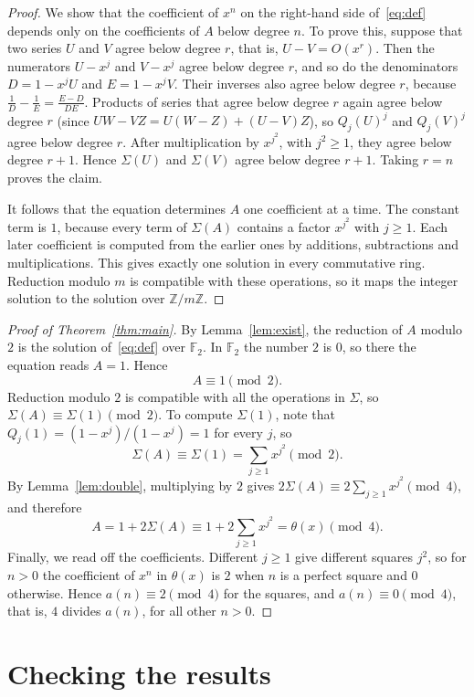 \documentclass[11pt,a4paper]{article}
\theoremstyle{definition}
\theoremstyle{remark}
\newcommand{\Z}{\mathbb{Z}}
\newcommand{\F}{\mathbb{F}}
\begin{document}
\begin{proof}
We show that the coefficient of $x^n$ on the right-hand side of~\eqref{eq:def} depends only on the coefficients of $A$
below degree $n$. To prove this, suppose that two series $U$ and $V$ agree below degree $r$, that is, $U-V=O(x^r)$. Then the numerators $U-x^j$ and
$V-x^j$ agree below degree $r$, and so do the denominators $D=1-x^jU$ and $E=1-x^jV$. Their inverses also agree below
degree $r$, because $\frac1D-\frac1E=\frac{E-D}{DE}$. Products of series that agree below degree $r$ again agree below
degree $r$ (since $UW-VZ=U(W-Z)+(U-V)Z$), so $Q_j(U)^j$ and $Q_j(V)^j$ agree below degree $r$. After multiplication by
$x^{j^2}$, with $j^2\ge1$, they agree below degree $r+1$. Hence $\Sigma(U)$ and $\Sigma(V)$ agree below degree $r+1$.
Taking $r=n$ proves the claim.

It follows that the equation determines $A$ one coefficient at a time. The constant term is $1$, because every term of
$\Sigma(A)$ contains a factor $x^{j^2}$ with $j\ge1$. Each later coefficient is computed from the earlier ones by
additions, subtractions and multiplications. This gives exactly one solution in every commutative ring. Reduction
modulo $m$ is compatible with these operations, so it maps the integer solution to the solution over $\Z/m\Z$.
\end{proof}

\begin{proof}[Proof of Theorem~\ref{thm:main}]
By Lemma~\ref{lem:exist}, the reduction of $A$ modulo $2$ is the solution of~\eqref{eq:def} over $\F_2$. In $\F_2$ the
number $2$ is $0$, so there the equation reads $A=1$. Hence
\[
A\equiv1\pmod 2 .
\]
Reduction modulo $2$ is compatible with all the operations in $\Sigma$, so $\Sigma(A)\equiv\Sigma(1)\pmod2$. To compute
$\Sigma(1)$, note that $Q_j(1)=(1-x^j)/(1-x^j)=1$ for every $j$, so
\[
\Sigma(A)\equiv\Sigma(1)=\sum_{j\ge1}x^{j^2}\pmod 2 .
\]
By Lemma~\ref{lem:double}, multiplying by $2$ gives $2\Sigma(A)\equiv2\sum_{j\ge1}x^{j^2}\pmod4$, and therefore
\[
A=1+2\Sigma(A)\equiv1+2\sum_{j\ge1}x^{j^2}=\theta(x)\pmod 4 .
\]
Finally, we read off the coefficients. Different $j\ge1$ give different squares $j^2$, so for $n>0$ the coefficient of
$x^n$ in $\theta(x)$ is $2$ when $n$ is a perfect square and $0$ otherwise. Hence $a(n)\equiv2\pmod4$ for the squares,
and $a(n)\equiv0\pmod4$, that is, $4$ divides $a(n)$, for all other $n>0$.
\end{proof}

\section{Checking the results}\label{sec:checks}
\end{document}
